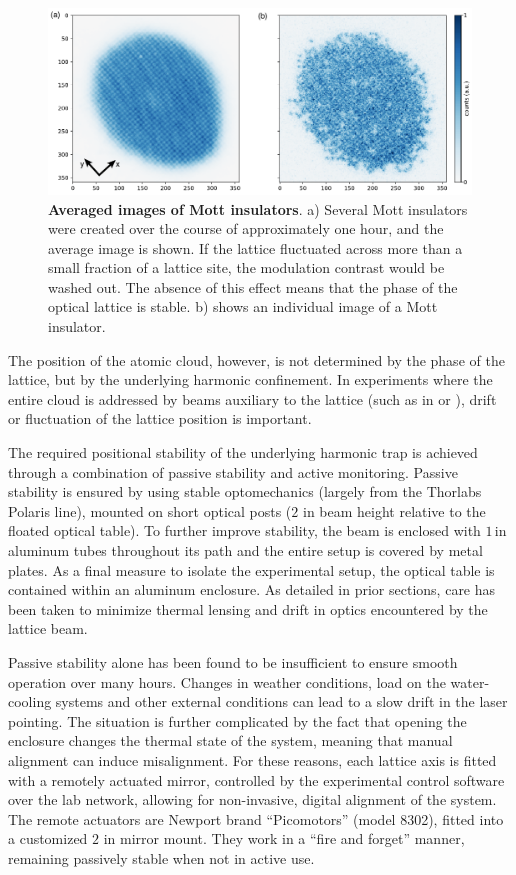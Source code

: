 \documentclass[twocolumn,aps,pra,showpacs,preprintnumbers,bibnotes]{revtex4-1}
\begin{document}
\begin{figure}
  \begin{center}
    \includegraphics{fig/AveragedMI.pdf}
    \caption{\textbf{Averaged images of Mott insulators}. a) Several Mott insulators were created over the course of approximately one hour, and the average image is shown\cite{Greif2016}. If the lattice fluctuated across more than a small fraction of a lattice site, the modulation contrast would be washed out. The absence of this effect means that the phase of the optical lattice is stable. b) shows an individual image of a Mott insulator.}\label{fig:averaged_mott}
  \end{center}
\end{figure}


The position of the atomic cloud, however, is not determined by the phase of the lattice, but by the underlying harmonic confinement. 
In experiments where the entire cloud is addressed by beams auxiliary to the lattice (such as in \cite{Mazurenko2016} or \cite{Choi2016}), drift or fluctuation of the lattice position is important.

The required positional stability of the underlying harmonic trap is achieved through a combination of passive stability and active monitoring. 
Passive stability is ensured by using stable optomechanics (largely from the Thorlabs Polaris line), mounted on short optical posts ($2$ in beam height relative to the floated optical table).
To further improve stability, the beam is enclosed with $1\,$in aluminum tubes throughout its path and the entire setup is covered by metal plates.
As a final measure to isolate the experimental setup, the optical table is contained within an aluminum enclosure. As detailed in prior sections, care has been taken to minimize thermal lensing and drift in optics encountered by the lattice beam.

Passive stability alone has been found to be insufficient to ensure smooth operation over many hours. Changes in weather conditions, load on the water-cooling systems and other external conditions can lead to a slow drift in the laser pointing.
The situation is further complicated by the fact that opening the enclosure changes the thermal state of the system, meaning that manual alignment can induce misalignment. 
For these reasons, each lattice axis is fitted with a remotely actuated mirror, controlled by the experimental control software over the lab network, allowing for non-invasive, digital alignment of the system. 
The remote actuators are Newport brand ``Picomotors'' (model 8302), fitted into a customized $2$ in mirror mount.
They work in a ``fire and forget'' manner, remaining passively stable when not in active use.
\end{document}
